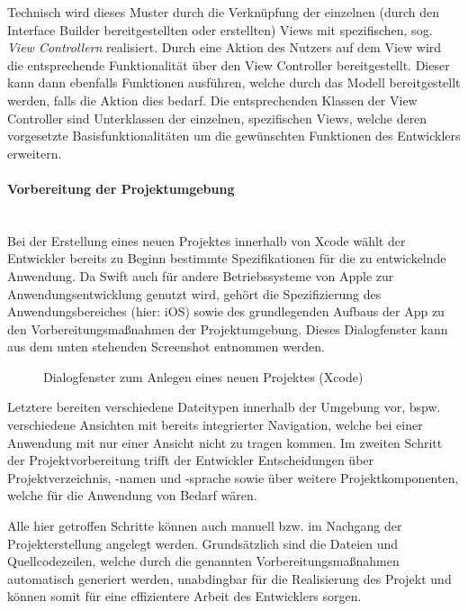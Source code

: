 
Technisch wird dieses Muster durch die Verknüpfung der einzelnen (durch den Interface Builder bereitgestellten oder erstellten) Views mit spezifischen, sog. \textit{View Controllern} realisiert. Durch eine Aktion des Nutzers auf dem View wird die entsprechende Funktionalität über den View Controller bereitgestellt. Dieser kann dann ebenfalls Funktionen ausführen, welche durch das Modell bereitgestellt werden, falls die Aktion dies bedarf. Die entsprechenden Klassen der View Controller sind Unterklassen der einzelnen, spezifischen Views, welche deren vorgesetzte Basisfunktionalitäten um die gewünschten Funktionen des Entwicklers erweitern.

\paragraph{Vorbereitung der Projektumgebung}\mbox{}\\
Bei der Erstellung eines neuen Projektes innerhalb von Xcode wählt der Entwickler bereits zu Beginn bestimmte Spezifikationen für die zu entwickelnde Anwendung. Da Swift auch für andere Betriebssysteme von Apple zur Anwendungsentwicklung genutzt wird, gehört die Spezifizierung des Anwendungsbereiches (hier: iOS) sowie des grundlegenden Aufbaus der App zu den Vorbereitungsmaßnahmen der Projektumgebung. Dieses Dialogfenster kann aus dem unten stehenden Screenshot entnommen werden.

\begin{figure}
	\centering
	\caption{Dialogfenster zum Anlegen eines neuen Projektes (Xcode)}
\end{figure}

Letztere bereiten verschiedene Dateitypen innerhalb der Umgebung vor, bspw. verschiedene Ansichten mit bereits integrierter Navigation, welche bei einer Anwendung mit nur einer Ansicht nicht zu tragen kommen. Im zweiten Schritt der Projektvorbereitung trifft der Entwickler Entscheidungen über Projektverzeichnis, -namen und -sprache sowie über weitere Projektkomponenten, welche für die Anwendung von Bedarf wären.

Alle hier getroffen Schritte können auch manuell bzw. im Nachgang der Projekterstellung angelegt werden. Grundsätzlich sind die Dateien und Quellcodezeilen, welche durch die genannten Vorbereitungsmaßnahmen automatisch generiert werden, unabdingbar für die Realisierung des Projekt und können somit für eine effizientere Arbeit des Entwicklers sorgen.

